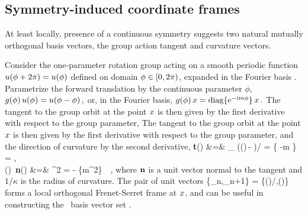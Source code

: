 \subsection{Symmetry-induced coordinate frames}
\label{s:symmIndCoo}

At least locally, presence of a continuous symmetry suggests two
natural mutually orthogonal basis vectors, the group action tangent and
curvature vectors.

Consider the one-parameter rotation group  acting on a smooth
periodic function $u({\bf \phi} + 2\pi) = u({\bf \phi})$ defined on domain
${\bf \phi} \in [0,2\pi)$, expanded in the Fourier basis
.
Parametrize the forward
translation by the continuous parameter $\phi$,
\(
    g(\phi)\,u({\bf \phi}) = u({\bf \phi}-\phi)
\,,
\)
or, in the Fourier basis,
\(
   g(\phi) \,x = \mathrm{diag}\{ \mathrm{e}^{-\mathrm{i}m\phi} \} \,x
\,.
\)
The tangent to the group orbit at the point $\ssp$ is then given by
the first derivative with respect to the group parameter,
The tangent to the group orbit at the point $\ssp$ is then given by
the first derivative with respect to the group parameter,
and the direction of curvature by the second derivative,
\bea
   {\bf t}(\ssp) &=&
   \lim_{\gSpace{}}
   \left(\LieEl(\gSpace)\,\ssp - \ssp\right)/\gSpace
   = \{ -m \} \, \ssp = \Lg \ssp,
\label{eq:tang}\\
   \kappa(\ssp)\, {\bf n}(\ssp) &=& \Lg^2 \ssp  = - \{m^2\} \, \ssp
   \,,
\label{eq:curv}
\eea
where $\mathbf{n}$ is a unit vector normal to the tangent and
$1/\kappa$ is the radius of curvature. The pair of unit vectors
    \PC{2011-10-28
    ``As $\Norm{\LieEl(\gSpace)\slicep}$ is a constant, for the group tangent
    vector $\Lg_\gSpace \slicep$ evaluated at $\slicep$ \refeq{eq:tang}
    $\braket{\slicep}{\Lg_\theta\,\slicep}$ vanishes ($\Lg_{\theta}$ is
    antisymmetric).''
The state vector $\ssp$ is not normal to \normVec(\ssp), as $\braket{\ssp
\Lg^2}{\ssp} = - \Norm{\groupTan(\ssp)}^2 \neq 0$, but can one use it to
produce from $\ssp$ the 3. local eigenbasis unit vector? Have not thought
that through. If we do that here, need to rewrite text leading to
\refeq{PCsectQ0}.
    }
\beq
\{{\be_n},{\be_{n+1}}\} =
\{\groupTan(\ssp)/\Norm{\groupTan(\ssp)},\normVec(\ssp)\}
forms a local orthogonal Frenet-Serret frame at $\ssp$, and can be useful
in constructing the \statesp\ basis vector set .



